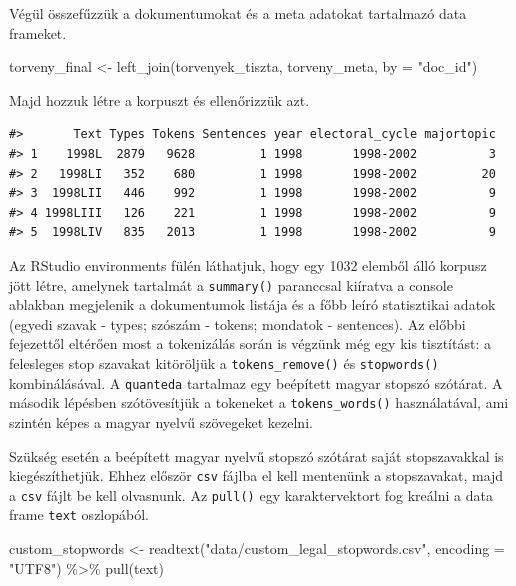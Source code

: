 \documentclass[
]{book}
\newenvironment{Shaded}{\begin{snugshade}}{\end{snugshade}}
\newcommand{\AttributeTok}[1]{\textcolor[rgb]{0.77,0.63,0.00}{#1}}
\newcommand{\FunctionTok}[1]{\textcolor[rgb]{0.00,0.00,0.00}{#1}}
\newcommand{\NormalTok}[1]{#1}
\newcommand{\OtherTok}[1]{\textcolor[rgb]{0.56,0.35,0.01}{#1}}
\newcommand{\SpecialCharTok}[1]{\textcolor[rgb]{0.00,0.00,0.00}{#1}}
\newcommand{\StringTok}[1]{\textcolor[rgb]{0.31,0.60,0.02}{#1}}
\begin{document}
Végül összefűzzük a dokumentumokat és a meta adatokat tartalmazó data
frameket.

\begin{Shaded}
\begin{Highlighting}[]
\NormalTok{torveny\_final }\OtherTok{\textless{}{-}} \FunctionTok{left\_join}\NormalTok{(torvenyek\_tiszta, torveny\_meta, }\AttributeTok{by =} \StringTok{"doc\_id"}\NormalTok{)}
\end{Highlighting}
\end{Shaded}

Majd hozzuk létre a korpuszt és ellenőrizzük azt.

\begin{verbatim}
#>       Text Types Tokens Sentences year electoral_cycle majortopic
#> 1    1998L  2879   9628         1 1998       1998-2002          3
#> 2   1998LI   352    680         1 1998       1998-2002         20
#> 3  1998LII   446    992         1 1998       1998-2002          9
#> 4 1998LIII   126    221         1 1998       1998-2002          9
#> 5  1998LIV   835   2013         1 1998       1998-2002          9
\end{verbatim}

Az RStudio environments fülén láthatjuk, hogy egy 1032 elemből álló
korpusz jött létre, amelynek tartalmát a \texttt{summary()} paranccsal
kiíratva a console ablakban megjelenik a dokumentumok listája és a főbb
leíró statisztikai adatok (egyedi szavak - types; szószám - tokens;
mondatok - sentences). Az előbbi fejezettől eltérően most a tokenizálás
során is végzünk még egy kis tisztítást: a felesleges stop szavakat
kitöröljük a \texttt{tokens\_remove()} és \texttt{stopwords()}
kombinálásával. A \texttt{quanteda} tartalmaz egy beépített magyar
stopszó szótárat. A második lépésben szótövesítjük a tokeneket a
\texttt{tokens\_words()} használatával, ami szintén képes a magyar
nyelvű szövegeket kezelni.

Szükség esetén a beépített magyar nyelvű stopszó szótárat saját
stopszavakkal is kiegészíthetjük. Ehhez először \texttt{csv} fájlba el
kell mentenünk a stopszavakat, majd a \texttt{csv} fájlt be kell
olvasnunk. Az \texttt{pull()} egy karaktervektort fog kreálni a data
frame \texttt{text} oszlopából.

\begin{Shaded}
\begin{Highlighting}[]
\NormalTok{custom\_stopwords }\OtherTok{\textless{}{-}} \FunctionTok{readtext}\NormalTok{(}\StringTok{"data/custom\_legal\_stopwords.csv"}\NormalTok{, }\AttributeTok{encoding =} \StringTok{"UTF8"}\NormalTok{) }\SpecialCharTok{\%\textgreater{}\%}
  \FunctionTok{pull}\NormalTok{(text)}
\end{Highlighting}
\end{Shaded}
\end{document}
